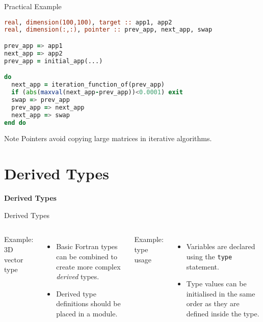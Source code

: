 \begin{frame}[fragile]{Practical Example}
\begin{lstlisting}[language=Fortran]
real, dimension(100,100), target :: app1, app2
real, dimension(:,:), pointer :: prev_app, next_app, swap

prev_app => app1
next_app => app2
prev_app = initial_app(...)

do
  next_app = iteration_function_of(prev_app)
  if (abs(maxval(next_app-prev_app))<0.0001) exit
  swap => prev_app
  prev_app => next_app
  next_app => swap
end do
\end{lstlisting}
  \begin{block}{Note}
    Pointers avoid copying large matrices in iterative algorithms.
  \end{block}
\end{frame}



\section{Derived Types}

\begin{frame}
	\centering
	\Huge \textbf{Derived Types}
\end{frame}

\begin{frame}[fragile]{Derived Types}

\begin{columns}[T]
  \begin{block}{Example: 3D vector type}
    
  \end{block}
  \begin{itemize}
  \item Basic Fortran types can be combined to create more complex \textit{derived} types.
  \item Derived type definitions should be placed in a module.
  \end{itemize}

  \begin{block}{Example: type usage}
  
  \end{block}
  \begin{itemize}
  \item Variables are declared using the \texttt{type} statement.
  \item Type values can be initialised in the same order as they are defined inside the type.
  \end{itemize}

\end{columns}
\end{frame}

